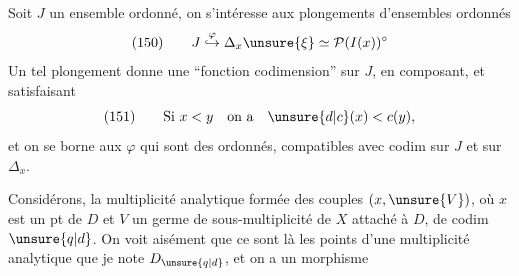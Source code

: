 Soit $J$ un ensemble ordonné, on s'intéresse aux plongements d'ensembles ordonnés
\[
(150)\qquad J\mathrel{\overset{\varphi}{\hookrightarrow}}\Delta_x\unsure{\xi}\simeq\mathcal P(I(x))^\circ
\]
Un tel plongement donne une ``fonction codimension'' sur $J$, en composant,  et  satisfaisant
\[
(151)\qquad\text{Si }x<y\quad\text{on a}\quad\unsure{d|c}(x)<c(y),
\]
et on se borne aux $\varphi$ qui sont des  ordonnés, compatibles avec  codim sur $J$ et sur $\Delta_x$.

Considérons,  la multiplicité analytique formée des couples $(x,\unsure{V})$, où $x$ est un pt de $D$ et $V$ un germe de sous-multiplicité de $X$ attaché à $D$, de codim $\unsure{q|d}$. On  voit aisément que ce sont  là les points d'une multiplicité analytique que je note $D_{\unsure{q|d}}$, et on a un morphisme
